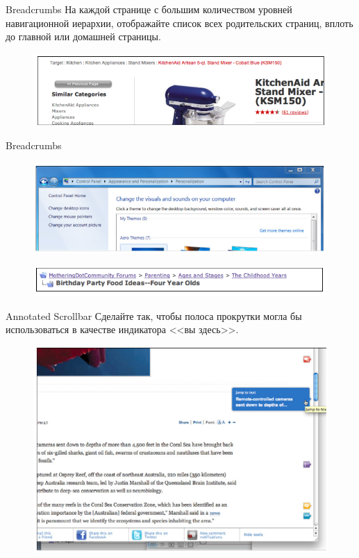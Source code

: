 \documentclass{beamer}
\begin{document}
\begin{frame}[t]{Breadcrumbs}
	На каждой странице с большим количеством уровней навигационной иерархии, отображайте список всех родительских страниц, вплоть до главной или домашней страницы.
	\begin{figure}[h]
		\centering
		\includegraphics[scale=0.5]{images/lec07-pic45.png}
	\end{figure}
\end{frame}	

\begin{frame}[t]{Breadcrumbs}
	\begin{figure}[h]
		\centering
		\includegraphics[scale=0.5]{images/lec07-pic46.png}
	\end{figure}
	\begin{figure}[h]
		\centering
		\includegraphics[scale=0.5]{images/lec07-pic47.png}
	\end{figure}	
\end{frame}

\begin{frame}[t]{Annotated Scrollbar}
	Сделайте так, чтобы полоса прокрутки могла бы использоваться в качестве индикатора <<вы здесь>>.
	\begin{figure}[h]
		\centering
		\includegraphics[scale=0.5]{images/lec07-pic48.png}
	\end{figure}
\end{frame}	
\end{document}

